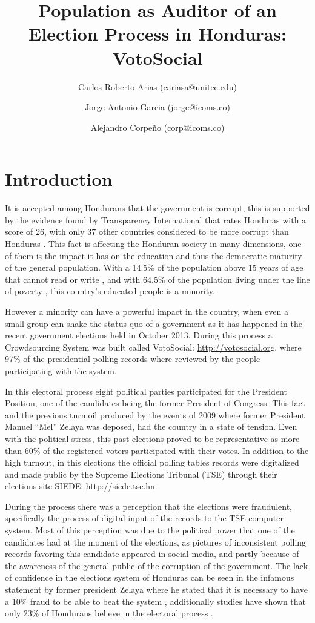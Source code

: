 \documentclass[a4paper,10pt]{article}
\title{Population as Auditor of an Election Process in Honduras: VotoSocial}
\author[1,2]{Carlos Roberto Arias (cariasa@unitec.edu)}
\author[1,3]{Jorge Antonio Garcia (jorge@icoms.co)}
\author[3]{Alejandro Corpeño (corp@icoms.co)}
\affil[1]{Facultad de Ingenier\'{i}a, UNITEC, Tegucigalpa, Honduras}
\affil[2]{Instituto de Investigaci\'{o}n de Pol\'{i}ticas P\'{u}blicas, UNITEC, Tegucigalpa, Honduras}
\affil[3]{Icoms Technologies S de RL, Tegucigalpa, Honduras}
\begin{document}
\maketitle

\begin{abstract}

\end{abstract}

\section{Introduction}
It is accepted among Hondurans that the government is corrupt, this is supported by the evidence found by Transparency International that rates Honduras with a score of 26, with only 37 other countries considered to be more corrupt than Honduras \citep{transp}. This fact is affecting the Honduran society in many dimensions, one of them is the impact it has on the education and thus the democratic maturity of the general population. With a 14.5\% of the population above 15 years of age that cannot read or write \citep{bchrep}, and with 64.5\% of the population living under the line of poverty \citep{wbdata}, this country's educated people is a minority.


However a minority can have a powerful impact in the country, when even a small group can shake the status quo of a government \citep{saadia2014} as it has happened in the recent government elections held in October 2013. During this process a Crowdsourcing System was built called VotoSocial: \url{http://votosocial.org}, where 97\% of the presidential polling records where reviewed by the people participating with the system.

In this electoral process eight political parties participated for the President Position, one of the candidates being the former President of Congress. This fact and the previous turmoil produced by the events of 2009 where former President Manuel “Mel” Zelaya was deposed, had the country in a state of tension. Even with the political stress, this past elections proved to be representative as more than 60\% of the registered voters participated with their votes. In addition to the high turnout, in this elections the official polling tables records were digitalized and made public by the Supreme Elections Tribunal (TSE) through their elections site SIEDE: \url{http://siede.tse.hn}.

During the process there was a perception that the elections were fraudulent, specifically the process of digital input of the records to the TSE computer system. Most of this perception was due to the political power that one of the candidates had at the moment of the elections, as pictures of inconsistent polling records favoring this candidate appeared in social media, and partly because of the awareness of the general public of the corruption of the government. The lack of confidence in the elections system of Honduras can be seen in the infamous statement by former president Zelaya where he stated that it is necessary to have a 10\% fraud to be able to beat the system \citep{melvid}, additionally studies have shown that only 23\% of Hondurans believe in the electoral process \citep{romero2014}.
\end{document}
